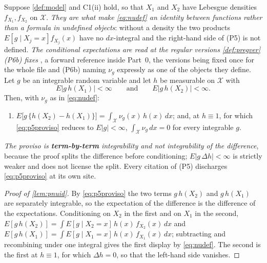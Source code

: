 \begin{lemma}\label{lem:pnuid}
Suppose \cref{def:model} and C1(ii) hold, so that $X_1$ and $X_2$ have Lebesgue densities $f_{X_1},f_{X_2}$
on $\mathcal X$. \emph{They are what make \eqref{eq:nudef} an identity between functions rather
than a formula in undefined objects}: without a density the two products
$E[g\mid X_j=x]f_{X_j}(x)$ have no $dx$-integral and the right-hand side of \textup{(P5)} is not defined.
\emph{The conditional expectations are read at the regular versions \cref{def:pregver}\textup{(P6b)} fixes}
, a forward reference inside Part~0, the versions being fixed once for the whole file and
\textup{(P6b)} naming $\nu_g$ expressly as one of the objects they define.
Let $g$ be an integrable random variable and let $h$ be measurable on $\mathcal X$ with
\begin{equation}\label{eq:p5proviso}
E\big|g\,h(X_1)\big|<\infty
\qquad\text{and}\qquad
E\big|g\,h(X_2)\big|<\infty .
\end{equation}
Then, with $\nu_g$ as in \eqref{eq:nudef}:
\begin{enumerate}
\item[\textup{(P5)}] $E\big[g\,\{h(X_2)-h(X_1)\}\big]=\int_{\mathcal X}\nu_g(x)\,h(x)\,dx$; and, at
$h\equiv1$, for which \eqref{eq:p5proviso} reduces to $E|g|<\infty$,
$\int_{\mathcal X}\nu_g\,dx=0$ for every integrable $g$.
\end{enumerate}
\emph{The proviso is \textbf{term-by-term} integrability and not integrability of the difference}, because
the proof splits the difference before conditioning; $E|g\,\Delta h|<\infty$ is strictly weaker and does
not license the split. Every citation of \textup{(P5)} discharges \eqref{eq:p5proviso} at its own
site.
\end{lemma}

\begin{proof}[Proof of \cref{lem:pnuid}]
By \eqref{eq:p5proviso} the two terms $g\,h(X_2)$ and $g\,h(X_1)$ are separately integrable, so the
expectation of the difference is the difference of the expectations. Conditioning on $X_2$ in the first
and on $X_1$ in the second,
$E[g\,h(X_2)]=\int E[g\mid X_2=x]\,h(x)\,f_{X_2}(x)\,dx$ and
$E[g\,h(X_1)]=\int E[g\mid X_1=x]\,h(x)\,f_{X_1}(x)\,dx$; subtracting and recombining under one integral
gives the first display by \eqref{eq:nudef}. The second is the first at $h\equiv1$, for which
$\Delta h=0$, so that the left-hand side vanishes.
\end{proof}

